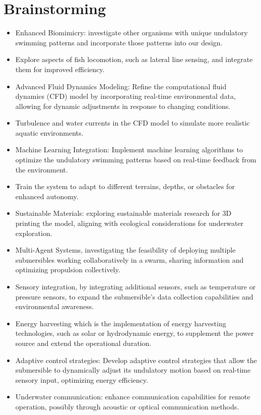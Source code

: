 \part{Brainstorming}

\begin{itemize}
    \item Enhanced Biomimicry: investigate other organisms with unique undulatory swimming patterns and incorporate those patterns into our design.
    \item Explore aspects of fish locomotion, such as lateral line sensing, and integrate them for improved efficiency.
    \item Advanced Fluid Dynamics Modeling: Refine the computational fluid dynamics (CFD) model by incorporating real-time environmental data, allowing for dynamic adjustments in response to changing conditions.
    \item Turbulence and water currents in the CFD model to simulate more realistic aquatic environments.
    \item Machine Learning Integration: Implement machine learning algorithms to optimize the undulatory swimming patterns based on real-time feedback from the environment.
    \item Train the system to adapt to different terrains, depths, or obstacles for enhanced autonomy.
    \item Sustainable Materials: exploring sustainable materials research for 3D printing the model, aligning with ecological considerations for underwater exploration.
    \item Multi-Agent Systems, investigating the feasibility of deploying multiple submersibles working collaboratively in a swarm, sharing information and optimizing propulsion collectively.
    \item Sensory integration, by integrating additional sensors, such as temperature or pressure sensors, to expand the submersible's data collection capabilities and environmental awareness.
    \item Energy harvesting which is the implementation of energy harvesting technologies, such as solar or hydrodynamic energy, to supplement the power source and extend the operational duration.
    \item Adaptive control strategies: Develop adaptive control strategies that allow the submersible to dynamically adjust its undulatory motion based on real-time sensory input, optimizing energy efficiency.
    \item Underwater communication: enhance communication capabilities for remote operation, possibly through acoustic or optical communication methods.

\end{itemize}
